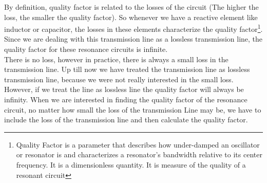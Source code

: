 By definition, quality factor is related to the losses of the circuit (The higher the loss, the smaller the quality factor). So whenever we have a reactive element like inductor or capacitor, the losses in these elements characterize the quality factor\footnote{Quality Factor is a parameter that describes how under-damped an oscillator or resonator is and characterizes a resonator's bandwidth relative to its center frequency. It is a dimensionless quantity.
It is measure of the quality of a resonant circuit}. Since we are dealing with this transmission line as a lossless transmission line, the quality factor for these resonance circuits is infinite.\\
There is no loss, however in practice, there is always a small loss in the transmission line. Up till now we have treated the transmission line as lossless transmission line, because we were not really interested in the small loss. However, if we treat the line as lossless line the quality factor will always be infinity. When we are interested in finding the quality factor of the resonance circuit, no matter how small the loss of the transmission
Line may be, we have to include the loss of the transmission line and then calculate the quality factor.
